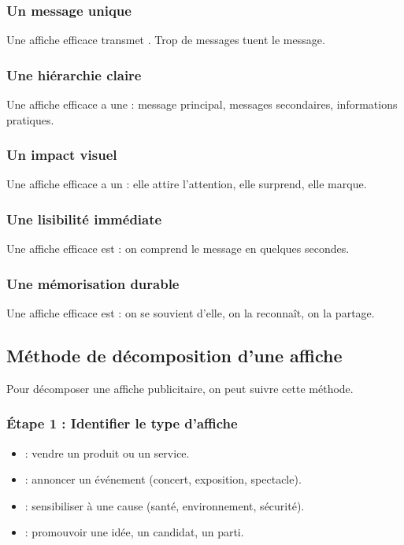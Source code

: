 \subsubsection{Un message unique}

Une affiche efficace transmet . Trop de messages tuent le message.

\subsubsection{Une hiérarchie claire}

Une affiche efficace a une  : message principal, messages secondaires, informations pratiques.

\subsubsection{Un impact visuel}

Une affiche efficace a un  : elle attire l'attention, elle surprend, elle marque.

\subsubsection{Une lisibilité immédiate}

Une affiche efficace est  : on comprend le message en quelques secondes.

\subsubsection{Une mémorisation durable}

Une affiche efficace est  : on se souvient d'elle, on la reconnaît, on la partage.

\subsection{Méthode de décomposition d'une affiche}

Pour décomposer une affiche publicitaire, on peut suivre cette méthode.

\subsubsection{Étape 1 : Identifier le type d'affiche}

\begin{itemize}
    \item {} : vendre un produit ou un service.
    \item {} : annoncer un événement (concert, exposition, spectacle).
    \item {} : sensibiliser à une cause (santé, environnement, sécurité).
    \item {} : promouvoir une idée, un candidat, un parti.
\end{itemize}

